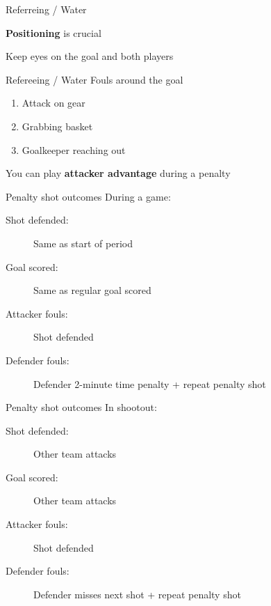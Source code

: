 \begin{frame}{Referreing / Water}
    \begin{center}
        \textbf{Positioning} is crucial \pause{}

        Keep eyes on the goal and both players
    \end{center}
\end{frame}

\begin{frame}{Refereeing / Water}
    Fouls around the goal

    \begin{enumerate}
        \item Attack on gear
        \item Grabbing basket
        \item Goalkeeper reaching out
    \end{enumerate}

    \pause{}

    You can play \textbf{attacker advantage} during a penalty
\end{frame}

\begin{frame}{Penalty shot outcomes}
    During a game:

    \begin{description}
        \item[Shot defended:] Same as start of period
        \item[Goal scored:] Same as regular goal scored
        \item[Attacker fouls:] Shot defended
        \item[Defender fouls:] Defender 2-minute time penalty + repeat penalty shot
    \end{description}
\end{frame}

\begin{frame}{Penalty shot outcomes}
    In shootout:

    \begin{description}
        \item[Shot defended:] Other team attacks
        \item[Goal scored:] Other team attacks
        \item[Attacker fouls:] Shot defended
        \item[Defender fouls:] Defender misses next shot + repeat penalty shot
    \end{description}
\end{frame}